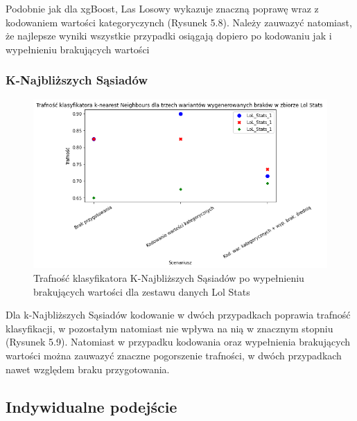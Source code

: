 \documentclass{book}
\begin{document}
    Podobnie jak dla xgBoost, Las Losowy wykazuje znaczną poprawę wraz 
    z kodowaniem wartości kategoryczynch (Rysunek 5.8). 
    Należy zauwazyć natomiast, że najlepsze wyniki wszystkie 
    przypadki osiągają dopiero po kodowaniu jak i wypełnieniu brakujących wartości

\subsubsection{K-Najbliższych Sąsiadów}
    \begin{figure}[H]
    \centerline{\includegraphics[scale=0.5]{Lol_stats_knn_Kodowanie}}
    \centering
    \caption{Trafność klasyfikatora K-Najbliższych Sąsiadów po wypełnieniu brakujących wartości dla zestawu danych Lol Stats}
    \end{figure}


    Dla k-Najbliższych Sąsiadów kodowanie w dwóch przypadkach poprawia 
    trafność klasyfikacji, w pozostałym natomiast nie wpływa na nią w 
    znacznym stopniu (Rysunek 5.9). Natomiast w przypadku kodowania oraz 
    wypełnienia brakujących wartości można zauwazyć znaczne pogorszenie 
    trafności, w dwóch przypadkach nawet względem braku przygotowania.

\subsection{Indywidualne podejście}
\end{document}
